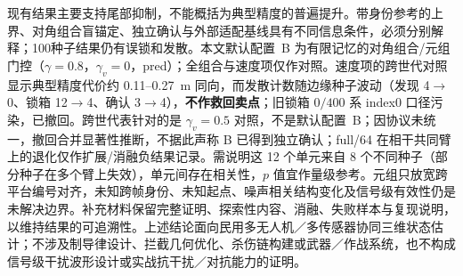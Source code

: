 \documentclass[UTF8,a4paper,zihao=-4]{ctexart}
\begin{document}
现有结果主要支持尾部抑制，不能概括为典型精度的普遍提升。带身份参考的上界、对角组合盲锚定、独立确认与外部适配基线具有不同信息条件，必须分别解释；100种子结果仍有误锁和发散。本文默认配置~B 为有限记忆的对角组合/元组门控（$\gamma=0.8$，$\gamma_v=0$，pred）；全组合与速度项仅作对照。速度项的跨世代对照显示典型精度代价约 0.11--0.27~m 同向，而发散计数随边缘种子波动（发现 4$\to$0、锁箱 12$\to$4、确认 3$\to$4），\textbf{不作救回卖点}；旧锁箱 $0/400$ 系 index0 口径污染，已撤回。跨世代表针对的是 $\gamma_v=0.5$ 对照，不是默认配置~B；因协议未统一，撤回合并显著性推断，不据此声称 B 已得到独立确认；full/64 在相干共同臂上的退化仅作扩展/消融负结果记录。需说明这 12 个单元来自 8 个不同种子（部分种子在多个臂上失效），单元间存在相关性，$p$ 值宜作量级参考。元组只放宽跨平台编号对齐，未知跨帧身份、未知起点、噪声相关结构变化及信号级有效性仍是未解决边界。补充材料保留完整证明、探索性内容、消融、失败样本与复现说明，以维持结果的可追溯性。上述结论面向民用多无人机／多传感器协同三维状态估计；不涉及制导律设计、拦截几何优化、杀伤链构建或武器／作战系统，也不构成信号级干扰波形设计或实战抗干扰／对抗能力的证明。
\end{document}
